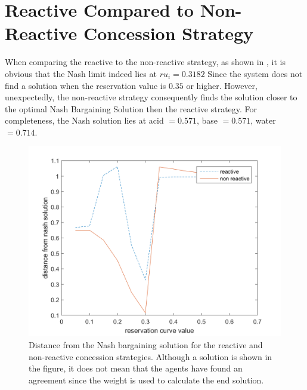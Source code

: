 \section{Reactive Compared to Non-Reactive Concession Strategy}
When comparing the reactive to the non-reactive strategy, as shown in , it is obvious that the Nash limit indeed lies at $ru_i = 0.3182$ Since the system does not find a solution when the reservation value is $0.35$ or higher. However, unexpectedly, the non-reactive strategy consequently finds the solution closer to the optimal Nash Bargaining Solution then the reactive strategy. For completeness, the Nash solution lies at acid $= 0.571$, base $= 0.571$, water $= 0.714$.

\begin{figure}[h]
	\centering
	\includegraphics[width=0.9\linewidth]{img/reactivevsnonreactive}
	\caption{Distance from the Nash bargaining solution for the reactive and non-reactive concession strategies. Although a solution is shown in the figure, it does not mean that the agents have found an agreement since the weight is used to calculate the end solution.}
	\label{fig:reactivevsnon-reactive}
\end{figure}

